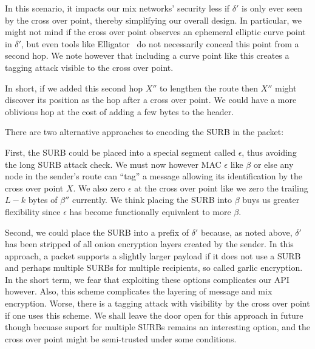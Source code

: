 In this scenario, it impacts our mix networks' security less if
$\delta'$ is only ever seen by the cross over point, thereby
simplifying our overall design.   In particular, we might not mind
if the cross over point observes an ephemeral elliptic curve point
in $\delta'$, but even tools like Elligator~\cite{elligator} do not
necessarily conceal this point from a second hop.  We note however
that including a curve point like this creates a tagging attack
visible to the cross over point.

In short, if we added this second hop $X''$ to lengthen the route
then $X''$ might discover its position as the hop after a cross over
point.  We could have a more oblivious hop at the cost of adding a
few bytes to the header.

\smallskip

There are two alternative approaches to encoding the SURB in the 
packet:  

First, the SURB could be placed into a special segment called
$\epsilon$, thus avoiding the long SURB attack check.
We must now however MAC $\epsilon$ like $\beta$ or else any
node in the sender's route can ``tag'' a message allowing its
identification by the cross over point $X$.  We also zero
$\epsilon$ at the cross over point like we zero the trailing
$L-k$ bytes of $\beta''$ currently.  We think placing the SURB
into $\beta$ buys us greater flexibility since $\epsilon$ has become
functionally equivalent to more $\beta$.

Second, we could place the SURB into a prefix of $\delta'$ because,
as noted above, $\delta'$ has been stripped of all onion encryption
layers created by the sender.  In this approach, a packet supports
a slightly larger payload if it does not use a SURB and perhaps
multiple SURBs for multiple recipients, so called garlic encryption.
In the short term, we fear that exploiting these options complicates
our API however.  Also, this scheme complicates the layering of
message and mix encryption.  Worse, there is a tagging attack with
visibility by the cross over point if one uses this scheme.  We shall
leave the door open for this approach in future though becuase suport
for multiple SURBs remains an interesting option, and the cross over
point might be semi-trusted under some conditions.





